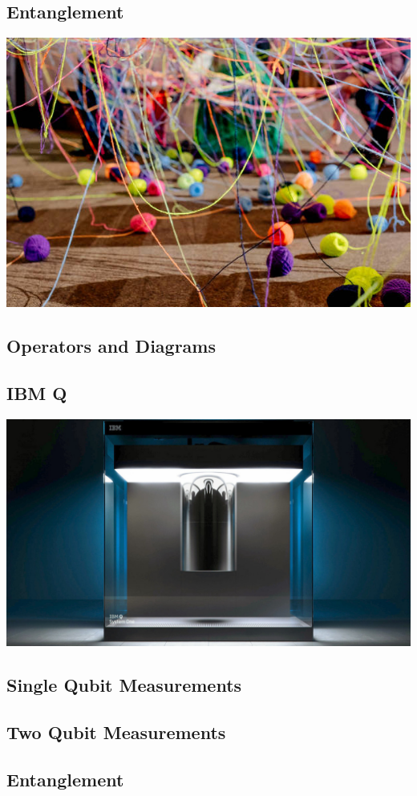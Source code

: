 \documentclass[10pt]{beamer}
\begin{document}
\begin{frame}
  \section{Entanglement}
  \centering
  \includegraphics[width=0.7\linewidth]{img/tangled-yarn.jpg}
\end{frame}
\begin{frame}
  \section{Operators and Diagrams}
\end{frame}
\begin{frame}
  \section{IBM Q}
  \centering
  \includegraphics[width=0.7\linewidth]{img/IBMQ.jpg}
\end{frame}

\begin{frame}
  \section{Single Qubit Measurements}
\end{frame}
\begin{frame}
  \section{Two Qubit Measurements}
\end{frame}
\begin{frame}
  \section{Entanglement}
\end{frame}
\end{document}
